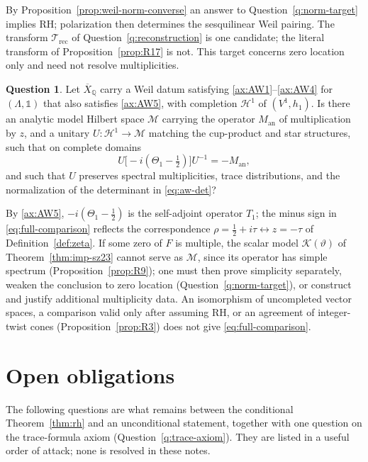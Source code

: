 \documentclass[11pt]{amsart}
\theoremstyle{plain}
\theoremstyle{definition}
\newtheorem{question}[theorem]{Question}
\theoremstyle{remark}
\numberwithin{equation}{section}
\newcommand{\Q}{\mathbb{Q}}
\newcommand{\Xbar}{\overline{X}}
\newcommand{\cH}{\mathscr{H}}
\begin{document}
By Proposition~\ref{prop:weil-norm-converse} an answer to
Question~\ref{q:norm-target} implies RH; polarization then determines
the sesquilinear Weil pairing. The transform $\mathcal T_{\mathrm{rec}}$
of Question~\ref{q:reconstruction} is one candidate; the literal
transform of Proposition~\ref{prop:R17} is not. This target concerns
zero location only and need not resolve multiplicities.

\begin{question}\label{q:full-comparison}
Let $\Xbar_\Q$ carry a Weil datum satisfying
\ref{ax:AW1}--\ref{ax:AW4} for $(\Lambda,\mathbb 1)$ that also
satisfies
\ref{ax:AW5}, with completion $\cH^1$ of $(V^1,h_1)$. Is
there an analytic model Hilbert space $\mathcal M$ carrying the
operator $M_{\mathrm{an}}$ of multiplication by $z$, and a unitary
$U:\cH^1\to\mathcal M$ matching the cup-product and star structures,
such that on complete domains
\begin{equation}\label{eq:full-comparison}
U\bigl[-i(\Theta_1-\tfrac12)\bigr]U^{-1}=-M_{\mathrm{an}},
\end{equation}
and such that $U$ preserves spectral multiplicities, trace
distributions, and the normalization of the determinant in
\eqref{eq:aw-det}?
\end{question}

By \ref{ax:AW5}, $-i(\Theta_1-\tfrac12)$ is the self-adjoint operator
$T_1$; the minus sign in \eqref{eq:full-comparison} reflects the
correspondence $\rho=\tfrac12+i\tau\leftrightarrow z=-\tau$ of
Definition~\ref{def:zeta}. If some zero of $F$ is multiple, the scalar
model $\mathcal K(\vartheta)$ of Theorem~\ref{thm:imp-sz23} cannot serve
as $\mathcal M$, since its operator has simple spectrum
(Proposition~\ref{prop:R9}); one must then prove simplicity separately,
weaken the conclusion to zero location
(Question~\ref{q:norm-target}), or construct and justify additional
multiplicity data. An isomorphism of uncompleted vector spaces, a
comparison valid only after assuming RH, or an agreement of
integer-twist cones (Proposition~\ref{prop:R3}) does not give
\eqref{eq:full-comparison}.

\section{Open obligations}\label{sec:open}

The following questions are what remains between the conditional
Theorem~\ref{thm:rh} and an unconditional statement, together with one
question on the trace-formula axiom (Question~\ref{q:trace-axiom}).
They are listed in a useful order of attack; none is resolved in these
notes.
\end{document}
